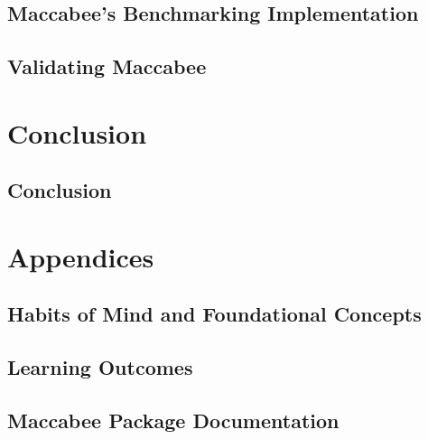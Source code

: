 \documentclass[oneside, fleqn]{book}
\begin{document}
\chapter{Maccabee's Benchmarking Implementation}
\label{chap:macimplementation}

\chapter{Validating Maccabee}
\label{chap:macvalidation}


\part{Conclusion}
\chapter{Conclusion}
\label{chap:conclusion}


\part{Appendices}
\appendix

\chapter{Habits of Mind and Foundational Concepts}
\label{app:hc-tags}


\chapter{Learning Outcomes}
\label{app:lo-tags}


\chapter{Maccabee Package Documentation}
\label{app:package-docs}


\backmatter

 
\end{document}
